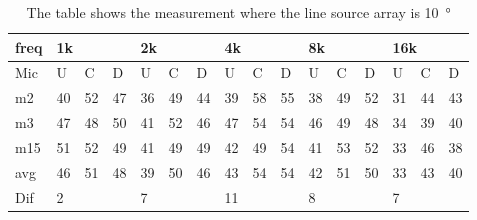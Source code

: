 \begin{table}[H]
\centering
\caption{The table shows the measurement where the line source array is \SI{10}{\degree}}
\begin{tabular}{l|l|l|l|l|l|l|l|l|l|l|l|l|lll}
freq & \multicolumn{3}{l|}{1k} & \multicolumn{3}{l|}{2k} & \multicolumn{3}{l|}{4k} & \multicolumn{3}{l|}{8k} & \multicolumn{3}{l}{16k}                                \\ \hline
Mic  & U      & C      & D     & U      & C      & D     & U      & C      & D     & U      & C      & D     & \multicolumn{1}{l|}{U}  & \multicolumn{1}{l|}{C}  & D  \\ \hline
m2    &  40    &  52    &  47    &  36    &  49    &   44   &  39    &   58    &   55   &   38    &  49    &  52    & \multicolumn{1}{l|}{31} & \multicolumn{1}{l|}{44} & 43 \\
m3    &  47    &  48    &  50    &   41   &  52    &   46   &   47   &  54     &   54   &   46    & 49     &  48    & \multicolumn{1}{l|}{34} & \multicolumn{1}{l|}{39} & 40 \\
m15  &  51    &  52    &  49    &  41    & 49     &   49   &   42   &   49    &   54   &    41   &   53   &  52    & \multicolumn{1}{l|}{33} & \multicolumn{1}{l|}{46} &  38\\ \hline
avg &  46    & 51     & 48     & 39     &   50   & 46     &  43    &  54     &  54    &  42     & 51     & 50     & \multicolumn{1}{l|}{33} & \multicolumn{1}{l|}{43}  & 40 \\ \hline  
Dif & \multicolumn{3}{l|}{2} & \multicolumn{3}{l|}{7} & \multicolumn{3}{l|}{11} & \multicolumn{3}{l|}{8} & \multicolumn{3}{l}{7}                                
\end{tabular}
\end{table}



